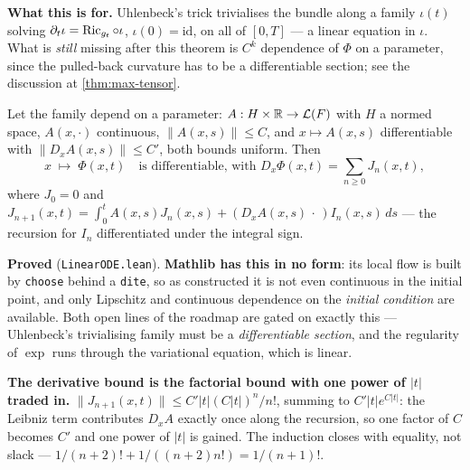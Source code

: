 \begin{theorem}
  \textbf{What this is for.} Uhlenbeck's trick trivialises the bundle along a family
  $\iota(t)$ solving $\partial_t \iota = \operatorname{Ric}_{g_t}\circ\iota$, $\iota(0) = \mathrm{id}$,
  on all of $[0,T]$ --- a linear equation in $\iota$. What is \emph{still} missing after
  this theorem is $C^k$ dependence of $\Phi$ on a parameter, since the pulled-back
  curvature has to be a differentiable section; see the discussion at
  \ref{thm:max-tensor}.
\end{theorem}

\begin{theorem}
  \label{thm:linear-ode-parameter}
  \leanok
  Let the family depend on a parameter: $A : H \times \mathbb{R} \to \mathcal{L}(F)$ with $H$ a normed
  space, $A(x,\cdot)$ continuous, $\|A(x,s)\| \le C$, and $x \mapsto A(x,s)$ differentiable
  with $\|D_xA(x,s)\| \le C'$, both bounds uniform. Then
  \[
    x \;\longmapsto\; \Phi(x,t) \quad\text{is differentiable, with } D_x\Phi(x,t)
      = \sum_{n\ge 0} J_n(x,t),
  \]
  where $J_0 = 0$ and $J_{n+1}(x,t) = \int_0^t A(x,s)J_n(x,s) + (D_xA(x,s)\,\cdot\,)I_n(x,s)\,ds$
  --- the recursion for $I_n$ differentiated under the integral sign.

  \textbf{Proved} (\texttt{LinearODE.lean}). \textbf{Mathlib has this in no form}: its local
  flow is built by \texttt{choose} behind a \texttt{dite}, so as constructed it is not even
  continuous in the initial point, and only Lipschitz and continuous dependence on the
  \emph{initial condition} are available. Both open lines of the roadmap are gated on exactly
  this --- Uhlenbeck's trivialising family must be a \emph{differentiable section}, and the
  regularity of $\exp$ runs through the variational equation, which is linear.

  \textbf{The derivative bound is the factorial bound with one power of $|t|$ traded in.}
  $\|J_{n+1}(x,t)\| \le C'|t|(C|t|)^n/n!$, summing to $C'|t|e^{C|t|}$: the Leibniz term
  contributes $D_xA$ exactly once along the recursion, so one factor of $C$ becomes $C'$ and
  one power of $|t|$ is gained. The induction closes with equality, not slack ---
  $1/(n+2)! + 1/((n+2)n!) = 1/(n+1)!$.


\end{theorem}

